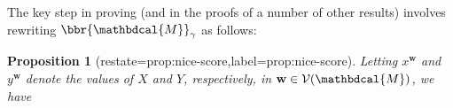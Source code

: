 \documentclass[letterpaper]{article} %
\theoremstyle{plain}
\newtheorem{prop}[theorem]{Proposition}
\theoremstyle{definition}
\theoremstyle{remark}
\newcommand\mat[1]{\mathbf{#1}}
\newcommand{\V}{\mathcal V}
\newcommand{\dg}[1]{\mathbdcal{#1}}
\begin{document}
The key step in proving 
(and in the proofs of a number of other results) involves 
rewriting  
$\bbr{\dg M}_\gamma$ as follows: 
\begin{prop}[restate=prop:nice-score,label=prop:nice-score]%
 Letting $x^{\mat w}$ and $y^{\mat w}$ denote the values of
  $X$ and $Y$, respectively, in $\mat w \in \V(\dg M)$, 
we have 
\begin{equation}\label{eq:semantics-breakdown}
\begin{split}

\end{split}
\end{equation}
\end{prop}
\end{document}
